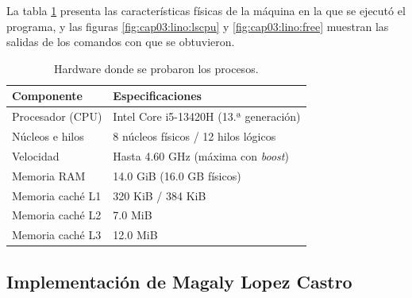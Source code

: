 La tabla \ref{tab:cap03:lino:hardware} presenta las características físicas de la máquina en la que se ejecutó el programa, y las figuras \ref{fig:cap03:lino:lscpu} y \ref{fig:cap03:lino:free} muestran las salidas de los comandos con que se obtuvieron.

\begin{table}[H]
    \centering
    \caption{Hardware donde se probaron los procesos.}
    \label{tab:cap03:lino:hardware}
    \begin{tabular}{p{}p{}}
        \toprule
        \textbf{Componente} & \textbf{Especificaciones} \\
        \midrule
        Procesador (CPU) & Intel Core i5-13420H (13.ª generación) \\
        Núcleos e hilos & 8 núcleos físicos / 12 hilos lógicos \\
        Velocidad & Hasta 4.60 GHz (máxima con \textit{boost}) \\
        Memoria RAM & 14.0 GiB (16.0 GB físicos) \\
        Memoria caché L1 & 320 KiB / 384 KiB \\
        Memoria caché L2 & 7.0 MiB \\
        Memoria caché L3 & 12.0 MiB \\
        \bottomrule
    \end{tabular}
\end{table}



\subsection{Implementación de Magaly Lopez Castro}
\label{sec:cap03:maga:implementacion}

